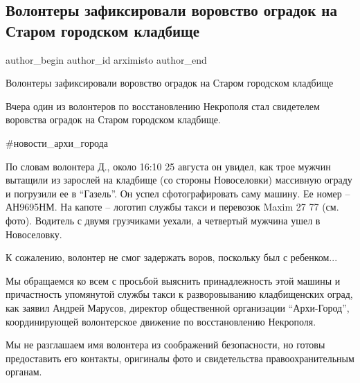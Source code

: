  
 
 
 
 

\subsection{Волонтеры зафиксировали воровство оградок на Старом городском кладбище}
\label{sec:26_08_2021.fb.arximisto.1.vorovstvo_ogradok_staroje_gorod_kladbische}

\ifcmt
 author_begin
   author_id arximisto
 author_end
\fi

Волонтеры зафиксировали воровство оградок на Старом городском кладбище

Вчера один из волонтеров по восстановлению Некрополя стал свидетелем воровства
оградок на Старом городском кладбище.

\#новости\_архи\_города

По словам волонтера Д., около 16:10 25 августа он увидел, как трое мужчин
вытащили из зарослей на кладбище (со стороны Новоселовки) массивную ограду и
погрузили ее в \enquote{Газель}. Он успел сфотографировать саму машину. Ее номер –
АН9695НМ.  На капоте – логотип службы такси и перевозок Maxim 27 77 (см. фото).
Водитель с двумя грузчиками уехали, а четвертый мужчина ушел в Новоселовку. 

К сожалению, волонтер не смог задержать воров, поскольку был с ребенком...

Мы обращаемся ко всем с просьбой выяснить принадлежность этой машины и
причастность упомянутой службы такси к разворовыванию кладбищенских оград, как
заявил Андрей Марусов, директор общественной организации \enquote{Архи-Город},
координирующей волонтерское движение по восстановлению Некрополя. 

Мы не разглашаем имя волонтера из соображений безопасности, но готовы
предоставить его контакты, оригиналы фото и свидетельства правоохранительным
органам.


